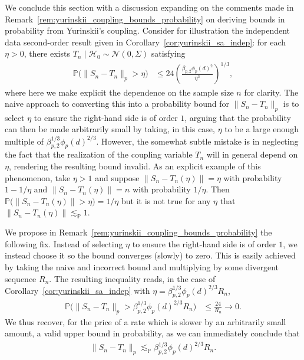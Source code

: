 \documentclass[11pt,lof]{puthesis}
\renewcommand{\P}{\ensuremath{\mathbb{P}}}
\newcommand{\cH}{\ensuremath{\mathcal{H}}}
\newcommand{\cN}{\ensuremath{\mathcal{N}}}
\theoremstyle{break}
\theoremstyle{proof}
\begin{document}
We conclude this section with a discussion expanding on the comments made
in Remark~\ref{rem:yurinskii_coupling_bounds_probability} on deriving bounds in
probability from Yurinskii's coupling. Consider for illustration the
independent data second-order result given in
Corollary~\ref{cor:yurinskii_sa_indep}: for each $\eta > 0$,
there exists $T_n \mid \cH_0 \sim \cN(0, \Sigma)$ satisfying
%
\begin{align*}
  \P\big(\|S_n-T_n\|_p > \eta\big)
  &\leq
  24 \left(
    \frac{\beta_{p,2} \phi_p(d)^2}{\eta^3}
  \right)^{1/3},
\end{align*}
%
where here we make explicit the dependence on the sample size $n$ for clarity.
The naive approach to converting this into a probability bound for
$\|S_n-T_n\|_p$ is to select $\eta$ to ensure the right-hand side is
of order $1$, arguing that the probability can then be made arbitrarily
small by taking, in this case, $\eta$ to be a large enough multiple of
$\beta_{p,2}^{1/3} \phi_p(d)^{2/3}$. However, the somewhat subtle mistake is
in neglecting the fact that the realization of the coupling variable $T_n$
will in general depend on $\eta$, rendering the resulting
bound invalid.
As an explicit example of this phenomenon, take $\eta > 1$ and suppose
$\|S_n - T_n(\eta)\| = \eta$ with probability $1 - 1/\eta$ and
$\|S_n - T_n(\eta)\| = n$ with probability $1/\eta$.
Then $\P\big(\|S_n - T_n(\eta)\| > \eta\big) = 1/\eta$
but it is not true for any $\eta$ that $\|S_n - T_n(\eta)\| \lesssim_\P 1$.

We propose in Remark~\ref{rem:yurinskii_coupling_bounds_probability} the
following fix.
Instead of selecting $\eta$ to ensure the right-hand side is of order $1$,
we instead choose it so the bound converges (slowly) to zero. This is
easily achieved by taking the naive and incorrect bound and multiplying
by some divergent sequence $R_n$. The resulting inequality reads,
in the case of Corollary~\ref{cor:yurinskii_sa_indep} with
$\eta = \beta_{p,2}^{1/3} \phi_p(d)^{2/3} R_n$,
%
\begin{align*}
  \P\Big(\|S_n-T_n\|_p >
    \beta_{p,2}^{1/3} \phi_p(d)^{2/3} R_n
  \Big)
  &\leq
  \frac{24}{R_n}
  \to 0.
\end{align*}
%
We thus recover, for the price of a rate which is slower by an arbitrarily
small amount, a valid upper bound in probability, as we can immediately
conclude that
%
\begin{align*}
  \|S_n-T_n\|_p
  \lesssim_\P
  \beta_{p,2}^{1/3} \phi_p(d)^{2/3} R_n.
\end{align*}
\end{document}

